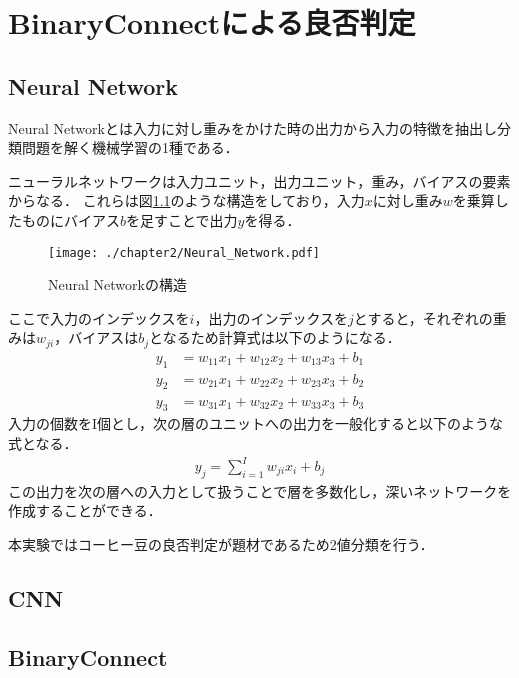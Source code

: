 

\chapter{BinaryConnectによる良否判定}

\section{Neural Network}
Neural Networkとは入力に対し重みをかけた時の出力から入力の特徴を抽出し分類問題を解く機械学習の1種である．

ニューラルネットワークは入力ユニット，出力ユニット，重み，バイアスの要素からなる．
これらは図\ref{fig_NN}のような構造をしており，入力$x$に対し重み$w$を乗算したものにバイアス$b$を足すことで出力$y$を得る．
\begin{figure}[]
  \begin{center}
    \texttt{[image: ./chapter2/Neural\_Network.pdf]}
    \caption{Neural Networkの構造}
    \label{fig_NN}
  \end{center}
\end{figure}
ここで入力のインデックスを$i$，出力のインデックスを$j$とすると，それぞれの重みは$w_{ji}$，バイアスは$b_j$となるため計算式は以下のようになる．
\begin{align*}
y_{1} &= w_{11}x_{1} + w_{12}x_{2} + w_{13}x_{3} + b_1\\
y_{2} &= w_{21}x_{1} + w_{22}x_{2} + w_{23}x_{3} + b_2\\
y_{3} &= w_{31}x_{1} + w_{32}x_{2} + w_{33}x_{3} + b_3
\end{align*}
入力の個数をI個とし，次の層のユニットへの出力を一般化すると以下のような式となる．
\begin{align*}
y_j = \sum^{I}_{i = 1} w_{ji}x_i + b_j
\end{align*}
この出力を次の層への入力として扱うことで層を多数化し，深いネットワークを作成することができる．

本実験ではコーヒー豆の良否判定が題材であるため2値分類を行う．
\section{CNN}

\section{BinaryConnect}

